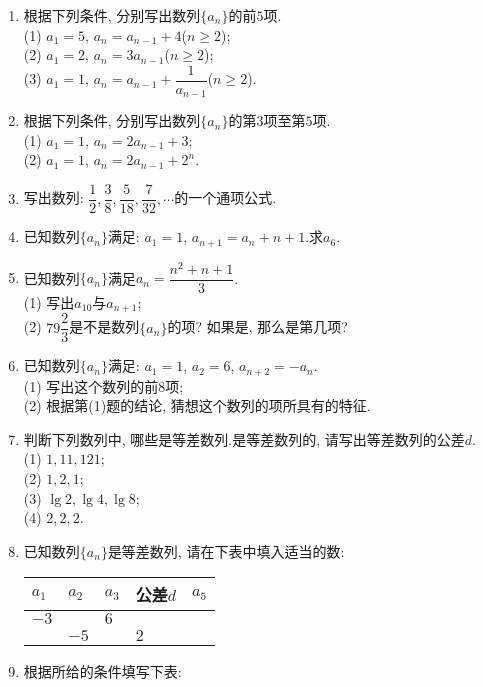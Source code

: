 \documentclass[10pt,a4paper]{article}
\newcommand{\blank}[1]{\underline{\hbox to #1pt{}}}
\begin{document}
\begin{enumerate}[1.]
\begin{center}
\begin{tikzpicture}[scale = 0.5]
    \end{tikzpicture}
    \blank{100}.
\end{center}
\item 根据下列条件, 分别写出数列$\{a_n\}$的前$5$项.\\
(1) $a_1=5$, $a_n=a_{n-1}+4$($n\ge 2$);\\
(2) $a_1=2$, $a_n=3a_{n-1}$($n\ge 2$);\\
(3) $a_1=1$, $a_n=a_{n-1}+\dfrac 1{a_{n-1}}$($n\ge 2$).
\item 根据下列条件, 分别写出数列$\{a_n\}$的第$3$项至第$5$项.\\
(1) $a_1=1$, $a_n=2a_{n-1}+3$;\\
(2) $a_1=1$, $a_n=2a_{n-1}+2^n$.
\item 写出数列: $\dfrac 12,\dfrac 38,\dfrac 5{18},\dfrac 7{32},\cdots$的一个通项公式.
\item 已知数列$\{a_n\}$满足: $a_1=1$, $a_{n+1}=a_n+n+1$.求$a_6$.
\item 已知数列$\{a_n\}$满足$a_n=\dfrac{n^2+n+1}3$.\\
(1) 写出$a_{10}$与$a_{n+1}$;\\
(2) $79\dfrac 23$是不是数列$\{a_n\}$的项? 如果是, 那么是第几项?
\item 已知数列$\{a_n\}$满足: $a_1=1$, $a_2=6$, $a_{n+2}=-a_n$.\\
(1) 写出这个数列的前$8$项;\\
(2) 根据第(1)题的结论, 猜想这个数列的项所具有的特征.
\item 判断下列数列中, 哪些是等差数列.是等差数列的, 请写出等差数列的公差$d$.\\
(1) $1, 11, 121$;\\
(2) $1, 2, 1$;\\
(3) $\lg 2,\lg 4,\lg 8$;\\
(4) $2, 2, 2$.
\item 已知数列$\{a_n\}$是等差数列, 请在下表中填入适当的数:
\begin{center}
    \begin{tabular}{|p{}<{\centering}|p{}<{\centering}|p{}<{\centering}|p{}<{\centering}|p{}<{\centering}|}
        \hline
        $a_1$ & $a_2$ & $a_3$ & 公差$d$ & $a_5$ \\ \hline
        $-3$ & & $6$ & & \\ \hline
        & $-5$ & & $2$ & \\ \hline
    \end{tabular}
\end{center}
\item 根据所给的条件填写下表:

\end{enumerate}
\end{document}
